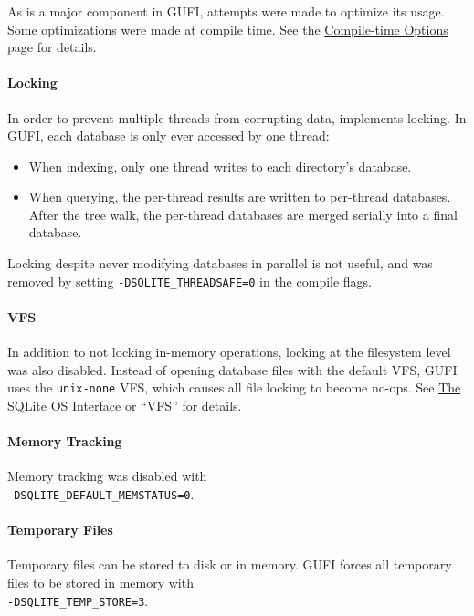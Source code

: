 \subsubsection{\sqlite}
As \sqlite is a major component in GUFI, attempts were made to
optimize its usage. Some optimizations were made at compile time. See
the \href{https://www.sqlite.org/compile.html}{\sqlite Compile-time
  Options} page for details.

\paragraph{Locking}
In order to prevent multiple threads from corrupting data, \sqlite
implements locking. In GUFI, each database is only ever accessed by
one thread:

\begin{itemize}
\item When indexing, only one thread writes to each directory's
  database.
\item When querying, the per-thread results are written to per-thread
  databases. After the tree walk, the per-thread databases are merged
  serially into a final database.
\end{itemize}

Locking despite never modifying databases in parallel is not useful,
and was removed by setting \texttt{-DSQLITE\_THREADSAFE=0} in the
compile flags.

\paragraph{VFS}
In addition to not locking in-memory operations, locking at the
filesystem level was also disabled. Instead of opening database files
with the default VFS, GUFI uses the \texttt{unix-none} VFS, which
causes all file locking to become no-ops. See
\href{https://www.sqlite.org/vfs.html}{The SQLite OS Interface or
``VFS''} for details.

\paragraph{Memory Tracking}
Memory tracking was disabled with \\
\noindent \texttt{-DSQLITE\_DEFAULT\_MEMSTATUS=0}.

\paragraph{Temporary Files}
Temporary files can be stored to disk or in memory. GUFI forces all
temporary files to be stored in memory with \\
\texttt{-DSQLITE\_TEMP\_STORE=3}.


